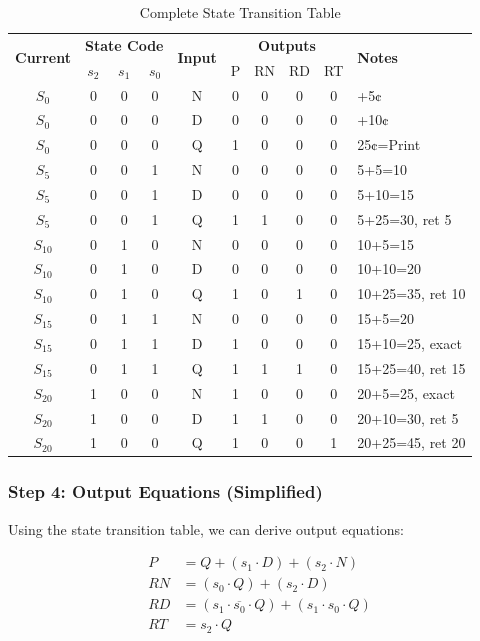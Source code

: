 \documentclass[12pt,a4paper]{article}
\begin{document}
\begin{table}[H]
\centering
\caption{Complete State Transition Table}
\small
\begin{tabular}{c|c|c|c|c|cccc|l}
\toprule
\multirow{2}{*}{\textbf{Current}} & \multicolumn{3}{c|}{\textbf{State Code}} & \multirow{2}{*}{\textbf{Input}} & \multicolumn{4}{c|}{\textbf{Outputs}} & \multirow{2}{*}{\textbf{Notes}} \\
& $s_2$ & $s_1$ & $s_0$ & & P & RN & RD & RT & \\
\midrule
$S_0$ & 0 & 0 & 0 & N & 0 & 0 & 0 & 0 & +5¢ \\
$S_0$ & 0 & 0 & 0 & D & 0 & 0 & 0 & 0 & +10¢ \\
$S_0$ & 0 & 0 & 0 & Q & 1 & 0 & 0 & 0 & 25¢=Print \\
\midrule
$S_5$ & 0 & 0 & 1 & N & 0 & 0 & 0 & 0 & 5+5=10 \\
$S_5$ & 0 & 0 & 1 & D & 0 & 0 & 0 & 0 & 5+10=15 \\
$S_5$ & 0 & 0 & 1 & Q & 1 & 1 & 0 & 0 & 5+25=30, ret 5 \\
\midrule
$S_{10}$ & 0 & 1 & 0 & N & 0 & 0 & 0 & 0 & 10+5=15 \\
$S_{10}$ & 0 & 1 & 0 & D & 0 & 0 & 0 & 0 & 10+10=20 \\
$S_{10}$ & 0 & 1 & 0 & Q & 1 & 0 & 1 & 0 & 10+25=35, ret 10 \\
\midrule
$S_{15}$ & 0 & 1 & 1 & N & 0 & 0 & 0 & 0 & 15+5=20 \\
$S_{15}$ & 0 & 1 & 1 & D & 1 & 0 & 0 & 0 & 15+10=25, exact \\
$S_{15}$ & 0 & 1 & 1 & Q & 1 & 1 & 1 & 0 & 15+25=40, ret 15 \\
\midrule
$S_{20}$ & 1 & 0 & 0 & N & 1 & 0 & 0 & 0 & 20+5=25, exact \\
$S_{20}$ & 1 & 0 & 0 & D & 1 & 1 & 0 & 0 & 20+10=30, ret 5 \\
$S_{20}$ & 1 & 0 & 0 & Q & 1 & 0 & 0 & 1 & 20+25=45, ret 20 \\
\bottomrule
\end{tabular}
\end{table}

\subsubsection{Step 4: Output Equations (Simplified)}

Using the state transition table, we can derive output equations:

\begin{align}
P &= Q + (s_1 \cdot D) + (s_2 \cdot N) \\
RN &= (s_0 \cdot Q) + (s_2 \cdot D) \\
RD &= (s_1 \cdot \overline{s_0} \cdot Q) + (s_1 \cdot s_0 \cdot Q) \\
RT &= s_2 \cdot Q
\end{align}
\end{document}
